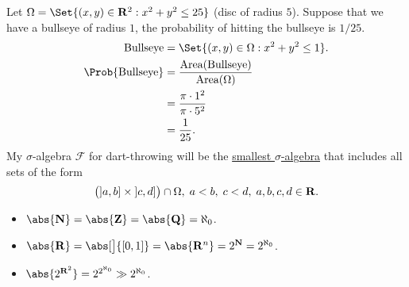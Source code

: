 \begin{Example}{}{}
    Let $ \Omega=\Set{(x,y)\in\mathbf{R}^2\given x^2+y^2\le 25} $
    (disc of radius $5$). Suppose that we have a bullseye of
    radius $ 1 $, the probability of hitting the bullseye
    is $ 1/25 $.
    \begin{align*}
        \text{Bullseye} & =\Set{(x,y)\in\Omega\given x^2+y^2\le 1}.                 \\
        \Prob{\text{Bullseye}}
                        & =\frac{\text{Area}(\text{Bullseye})}{\text{Area}(\Omega)} \\
                        & =\frac{\pi\cdot 1^2}{\pi\cdot 5^2}                        \\
                        & =\frac{1}{25}.
    \end{align*}
    My $ \sigma $-algebra $ \mathcal{F} $ for dart-throwing will be
    the \underline{smallest $ \sigma $-algebra} that includes all sets of the form
    \[ \bigl(\interval[open left]{a}{b}\times \interval[open left]{c}{d}\bigr)\cap \Omega,\; a<b,\; c<d,\; a,b,c,d\in\mathbf{R}. \]
    \begin{itemize}
        \item $ \abs{\mathbf{N}}=\abs{\mathbf{Z}}=\abs{\mathbf{Q}}=\aleph_0 $.
        \item $ \abs{\mathbf{R}}=\abs[\big]{[0,1]}=\abs{\mathbf{R}^n}=2^{\mathbf{N}}
                      =2^{\aleph_0} $.
        \item $ \abs{2^{\mathbf{R}^2}}=2^{2^{\aleph_0}}\gg 2^{\aleph_0} $.
    \end{itemize}
\end{Example}
